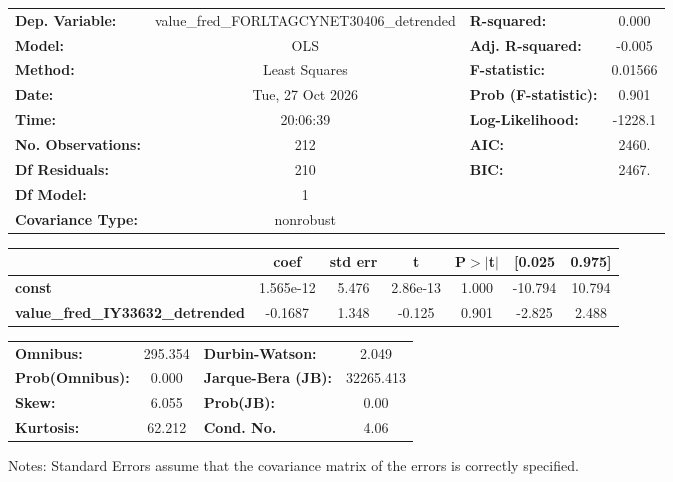 \begin{center}
\begin{tabular}{lclc}
\toprule
\textbf{Dep. Variable:}                  & value\_fred\_FORLTAGCYNET30406\_detrended & \textbf{  R-squared:         } &     0.000   \\
\textbf{Model:}                          &                    OLS                    & \textbf{  Adj. R-squared:    } &    -0.005   \\
\textbf{Method:}                         &               Least Squares               & \textbf{  F-statistic:       } &   0.01566   \\
\textbf{Date:}                           &              Tue, 27 Oct 2026             & \textbf{  Prob (F-statistic):} &    0.901    \\
\textbf{Time:}                           &                  20:06:39                 & \textbf{  Log-Likelihood:    } &   -1228.1   \\
\textbf{No. Observations:}               &                      212                  & \textbf{  AIC:               } &     2460.   \\
\textbf{Df Residuals:}                   &                      210                  & \textbf{  BIC:               } &     2467.   \\
\textbf{Df Model:}                       &                        1                  & \textbf{                     } &             \\
\textbf{Covariance Type:}                &                 nonrobust                 & \textbf{                     } &             \\
\bottomrule
\end{tabular}
\begin{tabular}{lcccccc}
                                         & \textbf{coef} & \textbf{std err} & \textbf{t} & \textbf{P$> |$t$|$} & \textbf{[0.025} & \textbf{0.975]}  \\
\midrule
\textbf{const}                           &    1.565e-12  &        5.476     &  2.86e-13  &         1.000        &      -10.794    &       10.794     \\
\textbf{value\_fred\_IY33632\_detrended} &      -0.1687  &        1.348     &    -0.125  &         0.901        &       -2.825    &        2.488     \\
\bottomrule
\end{tabular}
\begin{tabular}{lclc}
\textbf{Omnibus:}       & 295.354 & \textbf{  Durbin-Watson:     } &     2.049  \\
\textbf{Prob(Omnibus):} &   0.000 & \textbf{  Jarque-Bera (JB):  } & 32265.413  \\
\textbf{Skew:}          &   6.055 & \textbf{  Prob(JB):          } &      0.00  \\
\textbf{Kurtosis:}      &  62.212 & \textbf{  Cond. No.          } &      4.06  \\
\bottomrule
\end{tabular}
\end{center}

Notes: \newline
 [1] Standard Errors assume that the covariance matrix of the errors is correctly specified.